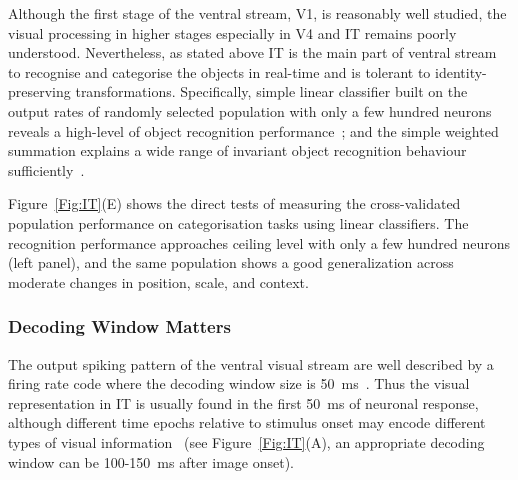 Although the first stage of the ventral stream, V1, is reasonably well studied, the visual processing in higher stages especially in V4 and IT remains poorly understood.
Nevertheless, as stated above IT is the main part of ventral stream to recognise and categorise the objects in real-time and is tolerant to identity-preserving transformations.
Specifically, simple linear classifier built on the output rates of randomly selected population with only a few hundred neurons reveals a high-level of object recognition performance~\cite{hung2005fast};
and the simple weighted summation explains a wide range of invariant object recognition behaviour sufficiently~\cite{majaj2012unified}.

Figure~\ref{Fig:IT}(E) shows the direct tests of measuring the cross-validated population performance on categorisation tasks using linear classifiers.
The recognition performance approaches ceiling level with only a few hundred neurons (left panel), and the same population shows a good generalization across moderate changes in position, scale, and context.
\subsubsection{Decoding Window Matters}
The output spiking pattern of the ventral visual stream are well described by a firing rate code where the decoding window size is 50~ms~\cite{hung2005fast}.
Thus the visual representation in IT is usually found in the first 50~ms of neuronal response, although different time epochs relative to stimulus onset may encode different types of visual information~\cite{brincat2006dynamic} (see Figure~\ref{Fig:IT}(A), an appropriate decoding window can be 100-150~ms after image onset).





